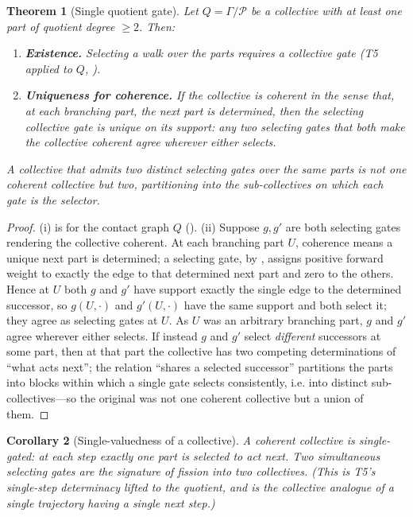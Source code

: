 \documentclass[11pt,a4paper]{article}
\theoremstyle{thmstyle}
\newtheorem{theorem}{Theorem}[section]
\newtheorem{corollary}[theorem]{Corollary}
\theoremstyle{definition}
\theoremstyle{remark}
\newcommand{\Gph}{\Gamma}                 %
\newcommand{\gate}{g}                     %
\newcommand{\Quot}{Q}                     %
\begin{document}
\begin{theorem}[Single quotient gate]
\label{thm:single-gate}
Let $\Quot=\Gph/\mathcal{P}$ be a collective with at least one part of quotient
degree $\ge2$. Then:
\begin{enumerate}[label=\textup{(\roman*)},leftmargin=2.2em]
\item \textbf{Existence.} Selecting a walk over the parts requires a collective
gate \textup{(}T5 applied to $\Quot$, \textup{)}.
\item \textbf{Uniqueness for coherence.} If the collective is coherent in the
sense that, at each branching part, the next part is determined, then the
selecting collective gate is unique on its support: any two selecting gates that
both make the collective coherent agree wherever either selects.
\end{enumerate}
A collective that admits two distinct selecting gates over the same parts is not
one coherent collective but two, partitioning into the sub-collectives on which
each gate is the selector.
\end{theorem}

\begin{proof}
(i) is  for the contact graph $\Quot$
(). (ii) Suppose $\gate,\gate'$ are both selecting gates rendering
the collective coherent. At each branching part $U$, coherence means a unique
next part is determined; a selecting gate, by , assigns positive
forward weight to exactly the edge to that determined next part and zero to the
others. Hence at $U$ both $\gate$ and $\gate'$ have support exactly the single
edge to the determined successor, so $\gate(U,\cdot)$ and $\gate'(U,\cdot)$ have
the same support and both select it; they agree as selecting gates at $U$. As $U$
was an arbitrary branching part, $\gate$ and $\gate'$ agree wherever either
selects. If instead $\gate$ and $\gate'$ select \emph{different} successors at
some part, then at that part the collective has two competing determinations of
``what acts next''; the relation ``shares a selected successor'' partitions the
parts into blocks within which a single gate selects consistently, i.e. into
distinct sub-collectives---so the original was not one coherent collective but a
union of them.
\end{proof}

\begin{corollary}[Single-valuedness of a collective]
\label{cor:single-valued}
A coherent collective is single-gated: at each step exactly one part is selected
to act next. Two simultaneous selecting gates are the signature of fission into
two collectives. \textup{(}This is T5's single-step determinacy lifted to the
quotient, and is the collective analogue of a single trajectory having a single
next step.\textup{)}
\end{corollary}
\end{document}
